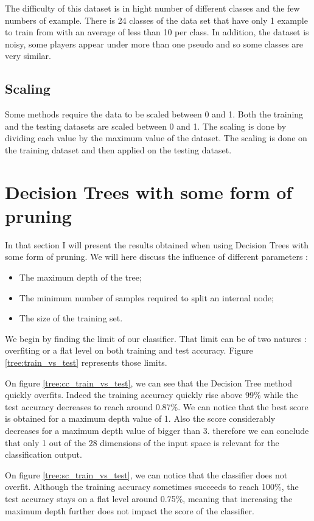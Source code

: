 \documentclass[10pt]{article}
\begin{document}
			The difficulty of this dataset is in hight number of different classes and the few numbers of example. There is 24 classes of the data set that have only 1 example to train from with an average of less than 10 per class. In addition, the dataset is noisy, some players appear under more than one pseudo and so some classes are very similar.

		\subsection*{Scaling}
			Some methods require the data to be scaled between 0 and 1. Both the training and the testing datasets are scaled between 0 and 1. The scaling is done by dividing each value by the maximum value of the dataset. The scaling is done on the training dataset and then applied on the testing dataset.
	\section{Decision Trees with some form of pruning}
		In that section I will present the results obtained when using Decision Trees with some form of pruning. We will here discuss the influence of different parameters :
		\begin{itemize}
			\item The maximum depth of the tree;
			\item The minimum number of samples required to split an internal node;
			\item The size of the training set.
		\end{itemize}

		We begin by finding the limit of our classifier. That limit can be of two natures : overfiting or a flat level on both training and test accuracy. Figure \ref{tree:train_vs_test} represents those limits.

		On figure \ref{tree:cc_train_vs_test}, we can see that the Decision Tree method quickly overfits. Indeed the training accuracy quickly rise above 99\% while the test accuracy decreases to reach around 0.87\%. We can notice that the best score is obtained for a maximum depth value of 1. Also the score considerably decreases for a maximum depth value of bigger than 3. therefore we can conclude that only 1 out of the 28 dimensions of the input space is relevant for the classification output.

		On figure \ref{tree:sc_train_vs_test}, we can notice that the classifier does not overfit. Although the training accuracy sometimes succeeds to reach 100\%, the test accuracy stays on a flat level around 0.75\%, meaning that increasing the maximum depth further does not impact the score of the classifier.
\end{document}
